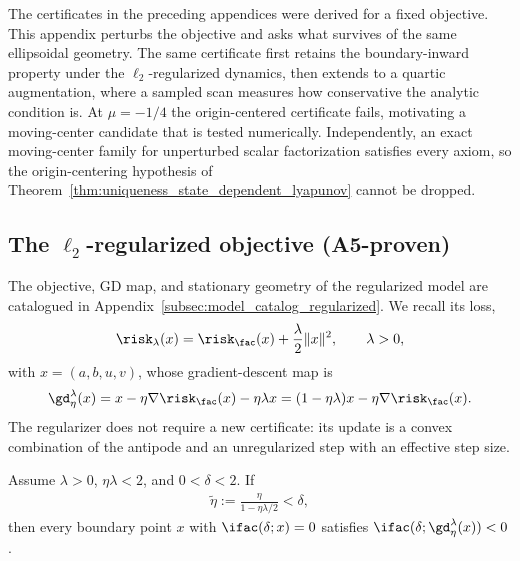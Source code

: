 \documentclass{article}
\begin{document}
The certificates in the preceding appendices were derived for a fixed
objective. This appendix perturbs the objective and asks what survives of the
same ellipsoidal geometry. The same certificate first retains the
boundary-inward property under the $\ell_2$-regularized dynamics, then
extends to a quartic augmentation, where a sampled scan measures how
conservative the analytic condition is. At $\mu=-1/4$ the origin-centered
certificate fails, motivating a moving-center candidate that is tested
numerically. Independently, an exact moving-center family for unperturbed
scalar factorization satisfies every axiom, so the origin-centering hypothesis
of Theorem~\ref{thm:uniqueness_state_dependent_lyapunov} cannot be dropped.

\subsection{The \texorpdfstring{$\ell_2$}{L2}-regularized objective (A5-proven)}
\label{subsec:regularized_factorization_boundary_inward}

The objective, GD map, and stationary geometry of the regularized model are
catalogued in Appendix~\ref{subsec:model_catalog_regularized}. We recall its
loss,
\begin{align}
\risk_\lambda(x)
=
\risk_\fac(x)
+
\frac{\lambda}{2}\|x\|^2,
\qquad \lambda>0,
\end{align}
with $x=(a,b,u,v)$, whose gradient-descent map is
\begin{align}
\gd_\eta^\lambda(x)
=
x-\eta\nabla \risk_\fac(x)-\eta\lambda x
=
(1-\eta\lambda)x-\eta\nabla \risk_\fac(x).
\label{eq:apxM_regularized_gd}
\end{align}
The regularizer does not require a new certificate: its update is a convex
combination of the antipode and an unregularized step with an effective step
size.

\begin{proposition}
\label{prop:regularized_factorization_boundary_inward}
Assume $\lambda>0$, $\eta\lambda<2$, and $0<\delta<2$. If
\begin{align}
\tilde\eta
:=
\frac{\eta}{1-\eta\lambda/2}
<\delta,
\label{eq:regularized_factorization_threshold}
\end{align}
then every boundary point $x$ with $\ifac(\delta;x)=0$ satisfies
$\ifac(\delta;\gd_\eta^\lambda(x))<0$.
\end{proposition}
\end{document}

